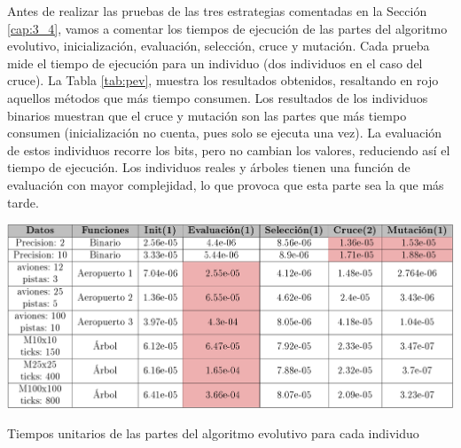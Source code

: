 Antes de realizar las pruebas de las tres estrategias comentadas en la Sección \ref{cap:3_4}, vamos a comentar los tiempos de ejecución de las partes del algoritmo evolutivo, inicialización, evaluación, selección, cruce y mutación. Cada prueba mide el tiempo de ejecución para un individuo (dos individuos en el caso del cruce). La Tabla \ref{tab:pev}, muestra los resultados obtenidos, resaltando en rojo aquellos métodos que más tiempo consumen. Los resultados de los individuos binarios muestran que el cruce y mutación son las partes que más tiempo consumen (inicialización no cuenta, pues solo se ejecuta una vez). La evaluación de estos individuos recorre los bits, pero no cambian los valores, reduciendo así el tiempo de ejecución. Los individuos reales y árboles tienen una función de evaluación con mayor complejidad, lo que provoca que esta parte sea la que más tarde. 



\begin{table}[!h]
	\centering
	\includegraphics[width=1\textwidth]{images/chapter_4/tabla_pev}		
	\caption{Tiempos unitarios de las partes del algoritmo evolutivo para cada individuo}
	\label{tab:pev}
\end{table}

